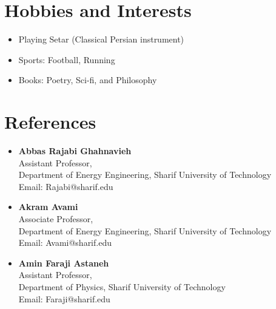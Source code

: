 \documentclass[letter,20pt]{article}
\begin{document}
\section{Hobbies and Interests}	    
\vspace{5pt}
    \begin{itemize}[noitemsep, topsep=6pt, after=\vspace{-5 mm}, leftmargin = 3ex]
        \item \small Playing Setar (Classical Persian instrument)\vspace{5pt}
        \item \small Sports: Football, Running\vspace{5pt}
	    \item \small Books: Poetry, Sci-fi, and Philosophy \vspace{5pt}
     
\end{itemize}
\vspace{0pt}

\section{References}	    
\vspace{5pt}

\begin{itemize}[leftmargin=3ex]
	\item \label{ref:prof1}\textbf{Abbas Rajabi Ghahnavieh}\vspace{2pt}\\
	Assistant Professor,\\
	Department of Energy Engineering, Sharif University of Technology\\
	Email: Rajabi@sharif.edu\vspace{5pt}
\end{itemize} 

\begin{itemize}[leftmargin=3ex]
	\item \label{ref:prof2}\textbf{Akram Avami}\vspace{2pt}\\
	Associate Professor,\\
	Department of Energy Engineering, Sharif University of Technology\\
	Email: Avami@sharif.edu\vspace{5pt}
\end{itemize}

\begin{itemize}[leftmargin=3ex]
	\item \label{ref:prof3}\textbf{Amin Faraji Astaneh}\vspace{2pt}\\
	Assistant Professor,\\
	Department of Physics, Sharif University of Technology\\
	Email: Faraji@sharif.edu\\
\end{itemize}

\vspace{5pt}
\end{document}
